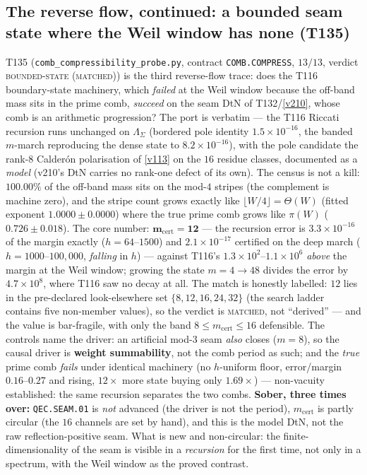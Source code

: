 \documentclass[11pt,a4paper]{article}
\begin{document}
\subsection{The reverse flow, continued: a bounded seam state where the Weil window has none (T135)}
T135 (\texttt{comb\_compressibility\_probe.py}, contract \texttt{COMB.COMPRESS}, $13/13$,
verdict \textsc{bounded-state (matched)}) is the third reverse-flow trace: does the T116
boundary-state machinery, which \emph{failed} at the Weil window because the off-band mass
sits in the prime comb, \emph{succeed} on the seam DtN of T132/\vref{v210}, whose comb is
an arithmetic progression? The port is verbatim --- the T116 Riccati recursion runs
unchanged on $\Lambda_\Sigma$ (bordered pole identity $1.5\times10^{-16}$, the banded
$m$-march reproducing the dense state to $8.2\times10^{-16}$), with the pole candidate the
rank-$8$ Calder\'on polarisation of \vref{v113} on the $16$ residue classes, documented as
a \emph{model} (v210's DtN carries no rank-one defect of its own). The census is not a
kill: $100.00\%$ of the off-band mass sits on the mod-$4$ stripes (the complement is
machine zero), and the stripe count grows exactly like $\lfloor W/4\rfloor=\Theta(W)$
(fitted exponent $1.0000\pm0.0000$) where the true prime comb grows like $\pi(W)$
($0.726\pm0.018$). The core number: $\mathbf{m_{\mathrm{cert}}=12}$ --- the recursion
error is $3.3\times10^{-16}$ of the margin exactly ($h=64$--$1500$) and
$2.1\times10^{-17}$ certified on the deep march ($h=1000$--$100{,}000$, \emph{falling} in
$h$) --- against T116's $1.3\times10^{2}$--$1.1\times10^{6}$ \emph{above} the margin at
the Weil window; growing the state $m=4\to48$ divides the error by $4.7\times10^{8}$,
where T116 saw no decay at all. The match is honestly labelled: $12$ lies in the
pre-declared look-elsewhere set $\{8,12,16,24,32\}$ (the search ladder contains five
non-member values), so the verdict is \textsc{matched}, not ``derived'' --- and the value
is bar-fragile, with only the band $8\le m_{\mathrm{cert}}\le16$ defensible. The controls
name the driver: an artificial mod-$3$ seam \emph{also} closes ($m=8$), so the causal
driver is \textbf{weight summability}, not the comb period as such; and the \emph{true}
prime comb \emph{fails} under identical machinery (no $h$-uniform floor, error/margin
$0.16$--$0.27$ and rising, $12\times$ more state buying only $1.69\times$) ---
non-vacuity established: the same recursion separates the two combs. \textbf{Sober, three
times over:} \texttt{QEC.SEAM.01} is \emph{not} advanced (the driver is not the period),
$m_{\mathrm{cert}}$ is partly circular (the $16$ channels are set by hand), and this is
the model DtN, not the raw reflection-positive seam. What is new and non-circular: the
finite-dimensionality of the seam is visible in a \emph{recursion} for the first time, not
only in a spectrum, with the Weil window as the proved contrast.
\end{document}
